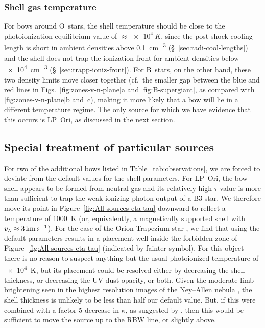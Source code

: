 \subsubsection{Shell gas temperature}
\label{sec:shell-gas-temp}
For bows around O~stars, the shell temperature should be close to the
photoionization equilibrium value of \(\approx \SI{e4}{K}\), since the
post-shock cooling length is short in ambient densities above
\SI{0.1}{cm^{-3}} (\S~\ref{sec:radi-cool-lengths}) and the shell does
not trap the ionization front for ambient densities below
\SI{e4}{cm^{-3}} (\S~\ref{sec:trapp-ioniz-front}).  For B~stars, on
the other hand, these two density limits move closer together (cf.~the
smaller gap between the blue and red lines in
Figs.~\ref{fig:zones-v-n-plane}a and \ref{fig:B-supergiant}, as
compared with \ref{fig:zones-v-n-plane}b and~c), making it more likely
that a bow will lie in a different temperature regime.  The only
source for which we have evidence that this occurs is LP~Ori, as
discussed in the next section.

\subsection{Special treatment of particular sources}
\label{sec:spec-treatm-part}

For two of the additional bows listed in Table~\ref{tab:observations},
we are forced to deviate from the default values for the shell
parameters.  For LP~Ori, the bow shell appears to be formed from
neutral gas \citep{ODell:2001c} and its relatively high \(\tau\) value
is more than sufficient to trap the weak ionizing photon output of a
B3 star.  We therefore move its point in
Figure~\ref{fig:All-sources-eta-tau} downward to reflect a temperature
of \SI{1000}{K} (or, equivalently, a magnetically supported shell with
\(v_{\scriptscriptstyle\text{A}} \approx \SI{3}{km.s^{-1}}\)).  For the case of the Orion
Trapezium star \thD{}, we find that using the default parameters
results in a placement well inside the forbidden zone of
Figure~\ref{fig:All-sources-eta-tau} (indicated by fainter symbol).
For this object there is no reason to suspect anything but the usual
photoionized temperature of \SI{e4}{K}, but its placement could be
resolved either by decreasing the shell thickness, or decreasing the
UV dust opacity, or both. Given the moderate limb brightening seen in
the highest resolution images of the Ney--Allen nebula
\citep{Robberto:2005a, Smith:2005a}, the shell thickness is unlikely
to be less than half our default value.  But, if this were combined
with a factor 5 decrease in \(\kappa\), as suggested by
\citet{Salgado:2016a}, then this would be sufficient to move the
source up to the RBW line, or slightly above.


